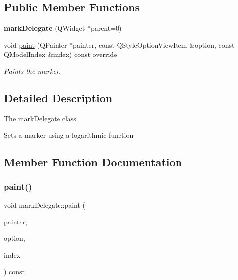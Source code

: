 \subsection*{Public Member Functions}
\begin{DoxyCompactItemize}
\item 
\mbox{\label{classmark_delegate_a17c6b7ea8acb051a7fb182cc8a8352a5}} 
{\bfseries mark\+Delegate} (Q\+Widget $\ast$parent=0)
\item 
void \mbox{\hyperlink{classmark_delegate_a6c1f926ab0b110da4571774e71d0516f}{paint}} (Q\+Painter $\ast$painter, const Q\+Style\+Option\+View\+Item \&option, const Q\+Model\+Index \&index) const override
\begin{DoxyCompactList}\small\item\em Paints the marker. \end{DoxyCompactList}\end{DoxyCompactItemize}


\subsection{Detailed Description}
The \mbox{\hyperlink{classmark_delegate}{mark\+Delegate}} class. 

Sets a marker using a logarithmic function 

\subsection{Member Function Documentation}
\mbox{\label{classmark_delegate_a6c1f926ab0b110da4571774e71d0516f}} 
\subsubsection{\texorpdfstring{paint()}{paint()}}
{\footnotesize\ttfamily void mark\+Delegate\+::paint (\begin{DoxyParamCaption}\item[{Q\+Painter $\ast$}]{painter,  }\item[{const Q\+Style\+Option\+View\+Item \&}]{option,  }\item[{const Q\+Model\+Index \&}]{index }\end{DoxyParamCaption}) const\hspace{0.3cm}{\ttfamily [override]}}



